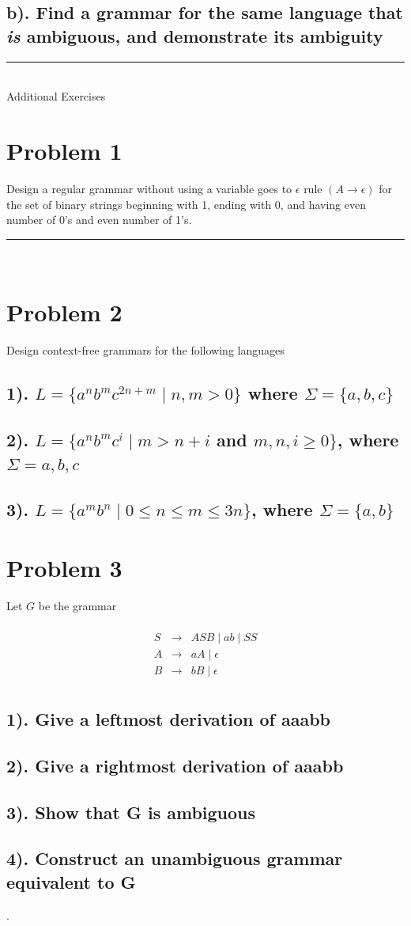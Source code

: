\documentclass[20pt]{article} %
\begin{document}
\subsection{b). Find a grammar for the same language that \textit{is} ambiguous, and demonstrate its ambiguity}


\noindent\rule{15cm}{0.4pt} \\
Additional Exercises
\section{Problem 1}
Design a regular grammar without using a variable goes to $\epsilon$ rule $(A \rightarrow \epsilon)$ for the set of binary strings beginning with 1, ending with 0, and having even number of 0's and even number of 1's.
 \noindent\rule{2cm}{0.4pt} \\

\section{Problem 2}
Design context-free grammars for the following languages
\subsection{1). $L = \{ a^{n}b^{m}c^{2n+m} \mid n,m > 0\}$ where $\Sigma = \{a,b,c\}$}
\subsection{2). $L = \{a^{n}b^{m}c^{i} \mid m > n + i$ and $m,n,i \geq 0\}$, where $\Sigma = {a,b,c}$}
\subsection{3). $L = \{a^{m}b^{n} \mid 0 \leq n \leq m \leq 3n\}$, where $\Sigma = \{a,b\}$}

\section{Problem 3}
Let $G$ be the grammar
 \begin{table}[!htbp]
 \[\begin{array}{ccc} 
&  \\
 S & \rightarrow & ASB \mid ab \mid SS\\
 A & \rightarrow & aA \mid \epsilon \\
 B & \rightarrow  & bB \mid \epsilon \\
 \end{array}\]
 \end{table}
\subsection{1). Give a leftmost derivation of aaabb}
\subsection{2). Give a rightmost derivation of aaabb}
\subsection{3). Show that G is ambiguous}
\subsection{4). Construct an unambiguous grammar equivalent to G}.
\end{document}
